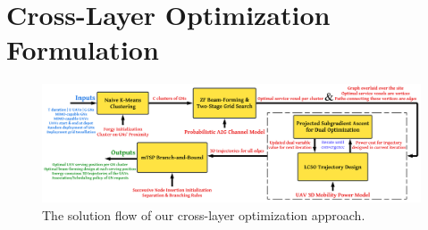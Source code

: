 \documentclass[10pt, twocolumn]{IEEEtran}
\renewcommand\theadalign{c}
\renewcommand{\tabcolsep}{12pt}
\renewcommand\theadfont{\bfseries}
\renewcommand\cellgape{\Gape[2pt]}
\renewcommand\theadgape{\Gape[2pt]}
\begin{document}
\section{Cross-Layer Optimization Formulation}\label{S3}
\begin{figure}[t]
     \centering
     \includegraphics[width=1.0\linewidth]{figs/solution_model.png}
     \vspace{-6mm}
     \caption{The solution flow of our cross-layer optimization approach.}
     \vspace{-3mm}
     \label{F3}
\end{figure}
\renewcommand\theadalign{c}
\renewcommand{\tabcolsep}{3pt}
\renewcommand\theadfont{\bfseries}
\renewcommand\cellgape{\Gape[1pt]}
\renewcommand\theadgape{\Gape[1pt]}
\end{document}
